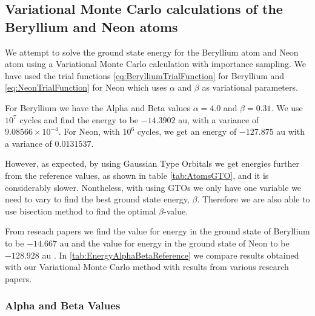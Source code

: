 \subsection{Variational Monte Carlo calculations of the Beryllium and Neon atoms}

	We attempt to solve the ground state energy for the Beryllium atom and Neon atom using a Variational Monte Carlo calculation with importance sampling. We have used the trial functions \eqref{eq:BerylliumTrialFunction} for Beryllium and \eqref{eq:NeonTrialFunction} for Neon which uses $\alpha$ and $\beta$ as variational parameters.

	For Beryllium we have the Alpha and Beta values $\alpha=4.0$ and $\beta=0.31$. We use $10^{7}$ cycles and find the energy to be $-14.3902$ au, with a variance of $9.08566 \times 10^{-4}$.
	For Neon, with $10^{6}$ cycles, we get an energy of $-127.875$ au with a variance of $0.0131537$.

	However, as expected, by using Gaussian Type Orbitals we get energies further from the reference values, as shown in table \ref{tab:AtomsGTO}, and it is considerably slower. Nontheless, with using GTOs we only have one variable we need to vary to find the best ground state energy, $\beta$. Therefore we are also able to use bisection method to find the optimal $\beta$-value.

	From reseach papers we find the value for energy in the ground state
	of Beryllium to be $-14.667$ au \parencite{Koput_2011_PCCP}  and the value
	for energy in the ground state of Neon to be \(-128.928\) au \parencite{Binkley_1975}.
	In \cref{tab:EnergyAlphaBetaReference} we compare results
	obtained with our Variational Monte Carlo method with results from
	various research papers.

	\subsubsection{Alpha and Beta Values}

